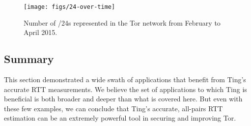
%


\begin{figure}[t]
\centering
%
\texttt{[image: figs/24-over-time]}
\caption{\label{fig:twentyfours} Number of /24s represented in the
Tor network from February to April 2015.}
\end{figure}




\subsection*{Summary} %

This section demonstrated a wide swath of applications that benefit
from Ting's accurate RTT measurements.
%
We believe the set of applications to which Ting is beneficial is both
broader and deeper than what is covered here.
%
But even with these few examples, we can conclude that Ting's accurate,
all-pairs RTT estimation can be an extremely powerful tool in securing
and improving Tor.

